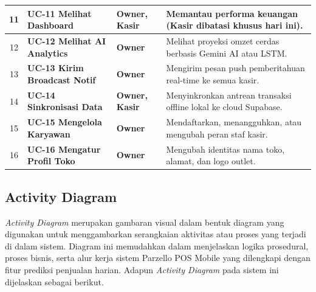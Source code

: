 \begin{center}
\begin{longtable}{|c|>{\bfseries}p{3.5cm}|>{\bfseries}p{2.5cm}|p{6cm}|}
\hline
11 & UC-11 Melihat Dashboard & Owner, Kasir & Memantau performa keuangan (Kasir dibatasi khusus hari ini). \\
\hline
12 & UC-12 Melihat AI Analytics & Owner & Melihat proyeksi omzet cerdas berbasis Gemini AI atau LSTM. \\
\hline
13 & UC-13 Kirim Broadcast Notif & Owner & Mengirim pesan push pemberitahuan real-time ke semua kasir. \\
\hline
14 & UC-14 Sinkronisasi Data & Owner, Kasir & Menyinkronkan antrean transaksi offline lokal ke cloud Supabase. \\
\hline
15 & UC-15 Mengelola Karyawan & Owner & Mendaftarkan, menangguhkan, atau mengubah peran staf kasir. \\
\hline
16 & UC-16 Mengatur Profil Toko & Owner & Mengubah identitas nama toko, alamat, dan logo outlet. \\
\hline
\end{longtable}
\end{center}

\subsection{Activity Diagram}
\textit{Activity Diagram} merupakan gambaran visual dalam bentuk diagram yang digunakan untuk menggambarkan serangkaian aktivitas atau proses yang terjadi di dalam sistem. Diagram ini memudahkan dalam menjelaskan logika prosedural, proses bisnis, serta alur kerja sistem Parzello POS Mobile yang dilengkapi dengan fitur prediksi penjualan harian. Adapun \textit{Activity Diagram} pada sistem ini dijelaskan sebagai berikut.


